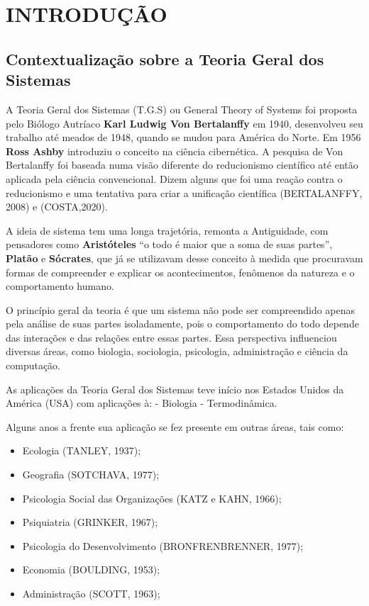 \section{INTRODUÇÃO}
\subsection{Contextualização sobre a Teoria Geral dos Sistemas}

A Teoria Geral dos Sistemas (T.G.S) ou General Theory of Systems foi proposta pelo Biólogo Autríaco \textbf{Karl Ludwig Von Bertalanffy} em 1940, desenvolveu seu trabalho até meados de 1948, quando se mudou para América do Norte. Em 1956 \textbf{Ross Ashby} introduziu o conceito na ciência cibernética. A pesquisa de Von Bertalanffy foi baseada numa visão diferente do reducionismo científico até então aplicada pela ciência convencional. Dizem alguns que foi uma reação contra o reducionismo e uma tentativa para criar a unificação científica (BERTALANFFY, 2008) e (COSTA,2020).\vskip0.3cm

A ideia de sistema tem uma longa trajetória, remonta a Antiguidade, com pensadores como \textbf{Aristóteles} “o todo é maior que a soma de suas partes”, \textbf{Platão} e \textbf{Sócrates}, que já se utilizavam desse conceito à medida que procuravam formas de compreender e explicar os acontecimentos, fenômenos da natureza e o comportamento humano.\vskip0.3cm

O princípio geral da teoria é que um sistema não pode ser compreendido apenas pela análise de suas partes isoladamente, pois o comportamento do todo depende das interações e das relações entre essas partes. Essa perspectiva influenciou diversas áreas, como biologia, sociologia, psicologia, administração e ciência da computação.\vskip0.3cm



As aplicações da Teoria Geral dos Sistemas teve início nos Estados Unidos da América (USA) com aplicações à: - Biologia - Termodinâmica.\vskip0.3cm

Alguns anos a frente sua aplicação se fez presente em outras áreas, tais como:

\begin{itemize}
    \item Ecologia (TANLEY, 1937);
    \item Geografia (SOTCHAVA, 1977);
    \item Psicologia Social das Organizações (KATZ e KAHN, 1966);
    \item Psiquiatria (GRINKER, 1967);
    \item Psicologia do Desenvolvimento (BRONFRENBRENNER, 1977);
    \item Economia (BOULDING, 1953);
    \item Administração (SCOTT, 1963);
\end{itemize}

